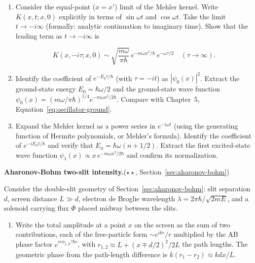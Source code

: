 \begin{problemset}
\begin{enumerate}
\item[(a)] Consider the equal-point ($x = x'$) limit of the Mehler kernel. Write $K(x,t;x,0)$ explicitly in terms of $\sin\omega t$ and $\cos\omega t$. Take the limit $t \to -i\infty$ (formally: analytic continuation to imaginary time). Show that the leading term as $t \to -i\infty$ is
\begin{linenomath}
\begin{equation}
K(x,-i\tau;x,0) \sim \sqrt{\frac{m\omega}{\pi\hbar}}\,e^{-m\omega x^2/\hbar}\,e^{-\omega\tau/2}\quad(\tau\to\infty).
\end{equation}
\end{linenomath}

\item[(b)] Identify the coefficient of $e^{-E_0\tau/\hbar}$ (with $\tau = -it$) as $|\psi_0(x)|^2$. Extract the ground-state energy $E_0 = \hbar\omega/2$ and the ground-state wave function $\psi_0(x) = (m\omega/\pi\hbar)^{1/4}e^{-m\omega x^2/2\hbar}$. Compare with Chapter~5, Equation~\eqref{eq:oscillator-ground}.

\item[(c)] Expand the Mehler kernel as a power series in $e^{-i\omega t}$ (using the generating function of Hermite polynomials, or Mehler's formula). Identify the coefficient of $e^{-iE_n t/\hbar}$ and verify that $E_n = \hbar\omega(n+1/2)$. Extract the first excited-state wave function $\psi_1(x) \propto x\,e^{-m\omega x^2/2\hbar}$ and confirm its normalization.
\end{enumerate}

\item[7.] \textbf{Aharonov-Bohm two-slit intensity.}\quad($\star\star$, Section~\ref{sec:aharonov-bohm})

Consider the double-slit geometry of Section~\ref{sec:aharonov-bohm}: slit separation $d$, screen distance $L \gg d$, electron de Broglie wavelength $\lambda = 2\pi\hbar/\sqrt{2mE}$, and a solenoid carrying flux $\Phi$ placed midway between the slits.

\begin{enumerate}
\item[(a)] Write the total amplitude at a point $x$ on the screen as the sum of two contributions, each of the free-particle form $\sim e^{ikr}/r$ multiplied by the AB phase factor $e^{ie\phi_{1,2}/\hbar c}$, with $r_{1,2} \approx L + (x \mp d/2)^2/2L$ the path lengths. The geometric phase from the path-length difference is $k(r_1 - r_2) \approx k d x/L$.


\end{enumerate}
\end{problemset}
